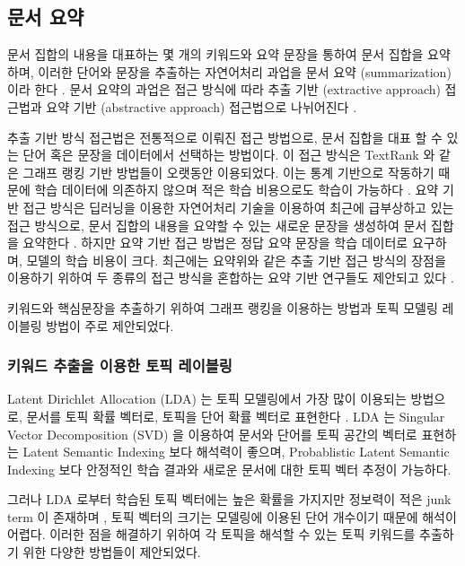\documentclass[11pt]{article}
\begin{document}
\subsection{문서 요약}

문서 집합의 내용을 대표하는 몇 개의 키워드와 요약 문장을 통하여 문서 집합을 요약하며, 이러한 단어와 문장을 추출하는 자연어처리 과업을 문서 요약 (summarization) 이라 한다 \citep{yao2017recent}.
문서 요약의 과업은 접근 방식에 따라 추출 기반 (extractive approach) 접근법과 요약 기반 (abstractive approach) 접근법으로 나뉘어진다 \citep{yao2017recent}.

추출 기반 방식 접근법은 전통적으로 이뤄진 접근 방법으로, 문서 집합을 대표 할 수 있는 단어 혹은 문장을 데이터에서 선택하는 방법이다.
이 접근 방식은 TextRank \citep{mihalcea2004textrank} 와 같은 그래프 랭킹 기반 방법들이 오랫동안 이용되었다.
이는 통계 기반으로 작동하기 때문에 학습 데이터에 의존하지 않으며 적은 학습 비용으로도 학습이 가능하다 \citep{parveen2015topical, narayan2018ranking}.
요약 기반 접근 방식은 딥러닝을 이용한 자연어처리 기술을 이용하여 최근에 급부상하고 있는 접근 방식으로, 문서 집합의 내용을 요약할 수 있는 새로운 문장을 생성하여 문서 집합을 요약한다 \citep{nallapati2016abstractive}.
하지만 요약 기반 접근 방법은 정답 요약 문장을 학습 데이터로 요구하며, 모델의 학습 비용이 크다.
최근에는 요약위와 같은 추출 기반 접근 방식의 장점을 이용하기 위하여 두 종류의 접근 방식을 혼합하는 요약 기반 연구들도 제안되고 있다 \citep{banerjee2015multi, bing2015abstractive, gu2016incorporating}.

키워드와 핵심문장을 추출하기 위하여 그래프 랭킹을 이용하는 방법과 토픽 모델링 레이블링 방법이 주로 제안되었다.

\subsubsection{키워드 추출을 이용한 토픽 레이블링}

Latent Dirichlet Allocation (LDA) 는 토픽 모델링에서 가장 많이 이용되는 방법으로, 문서를 토픽 확률 벡터로, 토픽을 단어 확률 벡터로 표현한다 \citep{blei2003latent}.
LDA 는 Singular Vector Decomposition (SVD) 을 이용하여 문서와 단어를 토픽 공간의 벡터로 표현하는 Latent Semantic Indexing \citep{landauer1998introduction} 보다 해석력이 좋으며, Probablistic Latent Semantic Indexing \citep{hofmann1999probabilistic} 보다 안정적인 학습 결과와 새로운 문서에 대한 토픽 벡터 추정이 가능하다.

그러나 LDA 로부터 학습된 토픽 벡터에는 높은 확률을 가지지만 정보력이 적은 junk term 이 존재하며 \citep{newman2010evaluating}, 토픽 벡터의 크기는 모델링에 이용된 단어 개수이기 때문에 해석이 어렵다.
이러한 점을 해결하기 위하여 각 토픽을 해석할 수 있는 토픽 키워드를 추출하기 위한 다양한 방법들이 제안되었다. 
\end{document}
